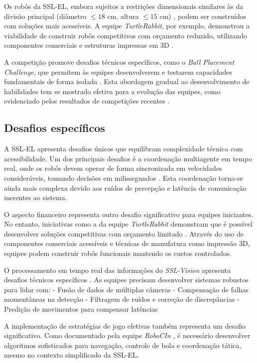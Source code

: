 Os robôs da SSL-EL, embora sujeitos a restrições dimensionais similares às da divisão principal (diâmetro $\leq 18$ cm, altura $\leq 15$ cm) \cite{regras_ssl_el_2024}, podem ser construídos com soluções mais acessíveis. A equipe \textit{TurtleRabbit}, por exemplo, demonstrou a viabilidade de construir robôs competitivos com orçamento reduzido, utilizando componentes comerciais e estruturas impressas em 3D \cite{turtlerabbit_tdp_2024}.

A competição promove desafios técnicos específicos, como o \textit{Ball Placement Challenge}, que permitem às equipes desenvolverem e testarem capacidades fundamentais de forma isolada \cite{ssl_overview}. Esta abordagem gradual ao desenvolvimento de habilidades tem se mostrado efetiva para a evolução das equipes, como evidenciado pelos resultados de competições recentes \cite{ssl_overview}.

\subsection{Desafios específicos}
\label{subsec:futebol_desafios}

A SSL-EL apresenta desafios únicos que equilibram complexidade técnica com acessibilidade. Um dos principais desafios é a coordenação multiagente em tempo real, onde os robôs devem operar de forma sincronizada em velocidades consideráveis, tomando decisões em milissegundos \cite{regras_ssl_el_2024}. Esta coordenação torna-se ainda mais complexa devido aos ruídos de percepção e latência de comunicação inerentes ao sistema.

O aspecto financeiro representa outro desafio significativo para equipes iniciantes. No entanto, iniciativas como a da equipe \textit{TurtleRabbit} demonstram que é possível desenvolver soluções competitivas com orçamento limitado \cite{turtlerabbit_tdp_2024}. Através do uso de componentes comerciais acessíveis e técnicas de manufatura como impressão 3D, equipes podem construir robôs funcionais mantendo os custos controlados.

O processamento em tempo real das informações do \textit{SSL-Vision} apresenta desafios técnicos específicos \cite{ssl_overview}. As equipes precisam desenvolver sistemas robustos para lidar com:
- Fusão de dados de múltiplas câmeras
- Compensação de falhas momentâneas na detecção
- Filtragem de ruídos e correção de discrepâncias
- Predição de movimentos para compensar latências

A implementação de estratégias de jogo efetivas também representa um desafio significativo. Como documentado pela equipe \textit{RoboCIn} \cite{robocin_tdp_2024}, é necessário desenvolver algoritmos sofisticados para navegação, controle de bola e coordenação tática, mesmo no contexto simplificado da SSL-EL.

